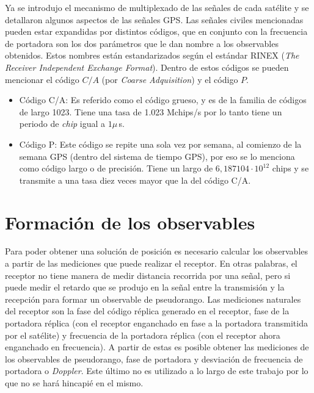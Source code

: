 \documentclass[a4paper,12pt,oneside,onecolumn,final,openright]{book}%
\begin{document}
	Ya se introdujo el mecanismo de multiplexado de las señales de cada satélite y se detallaron algunos aspectos de las señales GPS. Las señales civiles mencionadas pueden estar expandidas por distintos códigos, que en conjunto con la frecuencia de portadora son los dos parámetros que le dan nombre a los observables obtenidos. Estos nombres están estandarizados según el estándar RINEX (\textit{The Receiver Independent Exchange Format})\cite{rinex}. Dentro de estos códigos se pueden mencionar el código $C/A$ (por \textit{Coarse Adquisition}) y el código $P$.
\begin{itemize}
	\item Código C/A: Es referido como el código grueso, y es de la familia de códigos de largo 1023. Tiene una tasa de 1.023 Mchips/s por lo tanto tiene un periodo de \textit{chip} igual a $1\mu$\,s.
	\item Código P: Este código se repite una sola vez por semana, al comienzo de la semana GPS (dentro del sistema de tiempo GPS), por eso se lo menciona como código largo o de precisión. Tiene un largo de $6,187104\cdot 10^{12}$ chips y se transmite a una tasa diez veces mayor que la del código C/A.
\end{itemize}
\section{Formación de los observables}\label{sec:observables}
	  Para poder obtener una solución de posición es necesario calcular los observables a partir de las mediciones que puede realizar el receptor. En otras palabras, el receptor no tiene manera de medir distancia recorrida por una señal, pero si puede medir el retardo que se produjo en la señal entre la transmisión y la recepción para formar un observable de pseudorango. Las mediciones naturales del receptor son la fase del código réplica generado en el receptor, fase de la portadora réplica (con el receptor enganchado en fase a la portadora transmitida por el satélite) y frecuencia de la portadora réplica (con el receptor ahora enganchado en frecuencia). A partir de estas es posible obtener las mediciones de los observables de pseudorango, fase de portadora y desviación de frecuencia de portadora o \textit{Doppler}. Este último no es utilizado a lo largo de este trabajo por lo que no se hará hincapié en el mismo.
	
\end{document}
